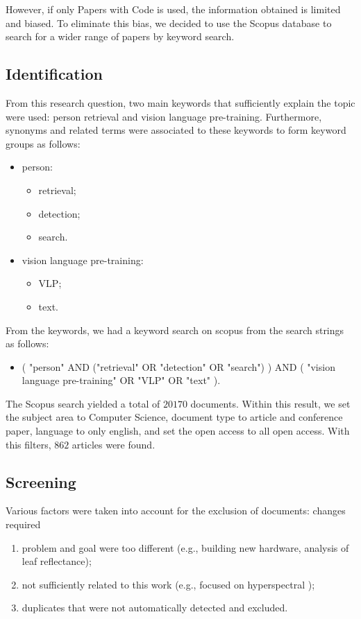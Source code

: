 However, if only Papers with Code is used, the information obtained is limited and biased. To eliminate this bias, we decided to use the Scopus database to search for a wider range of papers by keyword search.

\subsection*{Identification}
From this research question, two main keywords that sufficiently explain the topic were used: person retrieval and vision language pre-training.
Furthermore, synonyms and related terms were associated to these keywords to form keyword groups as follows:

\begin{itemize}
    \item person:
    \begin{itemize}
        \item retrieval;
        \item detection;
        \item search.
    \end{itemize}
    \item vision language pre-training:
    \begin{itemize}
        \item VLP;
        \item text.
    \end{itemize}
\end{itemize}


From the keywords, we had a keyword search on scopus from the search strings as follows:

\begin{itemize}
    \item ( "person" AND ("retrieval" OR "detection" OR "search") ) AND ( "vision language pre-training" OR "VLP" OR "text" ).
\end{itemize}

The Scopus search yielded a total of $20170$ documents. Within this result, we set the subject area to Computer Science, document type to article and conference paper, language to only english, and set the open access to all open access. With this filters, $862$ articles were found. 

\subsection{Screening}

Various factors were taken into account for the exclusion of documents:
{\color{red} changes required}
\begin{enumerate}
    \item problem and goal were too different (e.g., building new hardware, analysis of leaf reflectance);
    \item not sufficiently related to this work (e.g., focused on hyperspectral );
    \item duplicates that were not automatically detected and excluded.
\end{enumerate}

